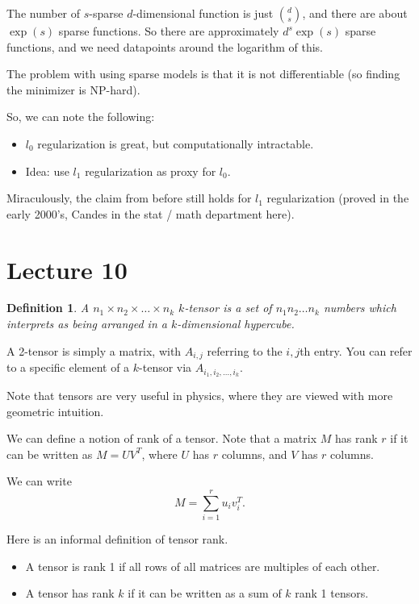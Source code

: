 \documentclass[12pt]{article}
\newtheorem*{definition}{Definition}
\begin{document}
The number of $s$-sparse $d$-dimensional function is just $\binom{d}{s}$, and there are about $\exp(s)$ sparse functions.  So there are approximately $d^s \exp(s)$ sparse functions, and we need datapoints around the logarithm of this.

The problem with using sparse models is that it is not differentiable (so finding the minimizer is NP-hard).

So, we can note the following:

\begin{itemize}
  \item $l_0$ regularization is great, but computationally intractable.
  \item Idea: use $l_1$ regularization as proxy for $l_0$.
\end{itemize}

Miraculously, the claim from before still holds for $l_1$ regularization (proved in the early 2000's, Candes in the stat / math department here).


\section{Lecture 10}

\begin{definition}
  A $n_1 \times n_2 \times \dots \times n_k$ $k$-tensor is a set of $n_1 n_2 \dots n_k$ numbers which interprets as being arranged in a $k$-dimensional hypercube.
\end{definition}

A 2-tensor is simply a matrix, with $A_{i,j}$ referring to the $i,j$th entry.  You can refer to a specific element of a $k$-tensor via $A_{i_1, i_2, \dots, i_k}$.

Note that tensors are very useful in physics, where they are viewed with more geometric intuition.

We can define a notion of rank of a tensor.  Note that a matrix $M$ has rank $r$ if it can be written as $M = UV^T$, where $U$ has $r$ columns, and $V$ has $r$ columns.

We can write
\[
  M = \sum_{i=1}^{r} u_i v_i^T.
\]

Here is an informal definition of tensor rank.

\begin{itemize}
  \item A tensor is rank 1 if all rows of all matrices are multiples of each other.
  \item A tensor has rank $k$ if it can be written as a sum of $k$ rank 1 tensors.
\end{itemize}
\end{document}
